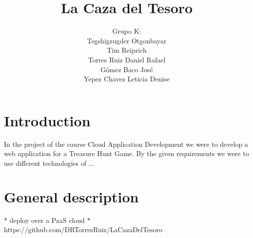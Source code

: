 \documentclass{article}
\title{La Caza del Tesoro}
\author{Grupo K: \\
	Tegshigzugder Otgonbayar \\
	Tim Reiprich \\
	Torres Ruiz Daniel Rafael \\
	Gómez Baco José \\
	Yepez Chavez Leticia Denise }
\begin{document}
\pagestyle{plain}

\maketitle



\newpage

\tableofcontents %
\newpage



\section{Introduction}
In the project of the course Cloud Application Development we were to develop a web application for a Treasure Hunt Game. By the given requirements we were to use different technologies of ...

\section{General description}

* deploy over a PaaS cloud \newline
* https://github.com/DRTorresRuiz/LaCazaDelTesoro
\end{document}
